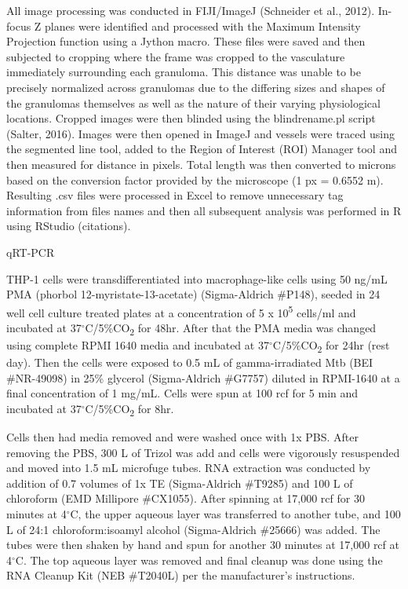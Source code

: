 All image processing was conducted in FIJI/ImageJ (Schneider et al., 2012). In-focus Z planes were identified and processed with the Maximum Intensity Projection function using a Jython macro. These files were saved and then subjected to cropping where the frame was cropped to the vasculature immediately surrounding each granuloma. This distance was unable to be precisely normalized across granulomas due to the differing sizes and shapes of the granulomas themselves as well as the nature of their varying physiological locations. Cropped images were then blinded using the blindrename.pl script (Salter, 2016). Images were then opened in ImageJ and vessels were traced using the segmented line tool, added to the Region of Interest (ROI) Manager tool and then measured for distance in pixels. Total length was then converted to microns based on the conversion factor provided by the microscope (1 px = 0.6552 \textmu m). Resulting .csv files were processed in Excel to remove unnecessary tag information from files names and then all subsequent analysis was performed in R using RStudio (citations).

qRT-PCR

THP-1 cells were transdifferentiated into macrophage-like cells using 50 ng/mL PMA (phorbol 12-myristate-13-acetate) (Sigma-Aldrich \#P148), seeded in 24 well cell culture treated plates at a concentration of 5 x 10\textsuperscript{5} cells/ml and incubated at 37$^{\circ}$C/5\%CO\textsubscript{2} for 48hr. After that the PMA media was changed using complete RPMI 1640 media and incubated at 37$^{\circ}$C/5\%CO\textsubscript{2} for 24hr (rest day). Then the cells were exposed to 0.5 mL of gamma-irradiated Mtb (BEI \#NR-49098) in 25\% glycerol (Sigma-Aldrich \#G7757) diluted in RPMI-1640 at a final concentration of 1 mg/mL. Cells were spun at 100 rcf for 5 min and incubated at 37$^{\circ}$C/5\%CO\textsubscript{2} for 8hr.

Cells then had media removed and were washed once with 1x PBS. After removing the PBS, 300 \textmu L of Trizol was add and cells were vigorously resuspended and moved into 1.5 mL microfuge tubes. RNA extraction was conducted by addition of 0.7 volumes of 1x TE (Sigma-Aldrich \#T9285) and 100 \textmu L of chloroform (EMD Millipore \#CX1055). After spinning at 17,000 rcf for 30 minutes at 4$^{\circ}$C, the upper aqueous layer was transferred to another tube, and 100 \textmu L of 24:1 chloroform:isoamyl alcohol (Sigma-Aldrich \#25666) was added. The tubes were then shaken by hand and spun for another 30 minutes at 17,000 rcf at 4$^{\circ}$C. The top aqueous layer was removed and final cleanup was done using the RNA Cleanup Kit (NEB \#T2040L) per the manufacturer's instructions.


